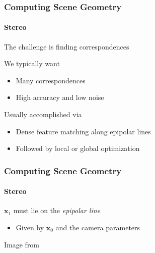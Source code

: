 \documentclass[xetex,professionalfont]{beamer}
\renewcommand{\vec}[1]{\ensuremath{\mathbf{#1}}}
\newcommand{\vx}{\vec{x}}
\begin{document}
\begin{frame}
\frametitle{Computing Scene Geometry}
\framesubtitle{Stereo}

The challenge is finding correspondences

\bigskip
We typically want
\begin{itemize}
    \item Many correspondences %
    \item High accuracy and low noise
\end{itemize}

\bigskip
Usually accomplished via
\begin{itemize}
    \item Dense feature matching along epipolar lines
    \item Followed by local or global optimization %
\end{itemize}

\end{frame}


\begin{frame}
\frametitle{Computing Scene Geometry}
\framesubtitle{Stereo}

$\vx_1$ must lie on the \emph{epipolar line} %
\begin{itemize}
    \item Given by $\vx_0$ and the camera parameters %
\end{itemize}

\begin{center}
    {\centering Image from \cite{szeliski2010}}
\end{center}

\end{frame}
\end{document}
